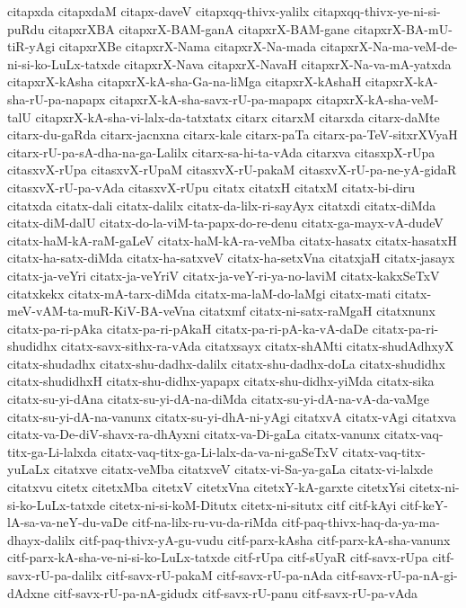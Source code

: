 {citapxda
citapxdaM
citapx-daveV
citapxqq-thivx-yalilx
citapxqq-thivx-ye-ni-si-puRdu
citapxrXBA
citapxrX-BAM-ganA
citapxrX-BAM-gane
citapxrX-BA-mU-tiR-yAgi
citapxrXBe
citapxrX-Nama
citapxrX-Na-mada
citapxrX-Na-ma-veM-de-ni-si-ko-LuLx-tatxde
citapxrX-Nava
citapxrX-NavaH
citapxrX-Na-va-mA-yatxda
citapxrX-kAsha
citapxrX-kA-sha-Ga-na-liMga
citapxrX-kAshaH
citapxrX-kA-sha-rU-pa-napapx
citapxrX-kA-sha-savx-rU-pa-mapapx
citapxrX-kA-sha-veM-talU
citapxrX-kA-sha-vi-lalx-da-tatxtatx
citarx
citarxM
citarxda
citarx-daMte
citarx-du-gaRda
citarx-jacnxna
citarx-kale
citarx-paTa
citarx-pa-TeV-sitxrXVyaH
citarx-rU-pa-sA-dha-na-ga-Lalilx
citarx-sa-hi-ta-vAda
citarxva
citasxpX-rUpa
citasxvX-rUpa
citasxvX-rUpaM
citasxvX-rU-pakaM
citasxvX-rU-pa-ne-yA-gidaR
citasxvX-rU-pa-vAda
citasxvX-rUpu
citatx
citatxH
citatxM
citatx-bi-diru
citatxda
citatx-dali
citatx-dalilx
citatx-da-lilx-ri-sayAyx
citatxdi
citatx-diMda
citatx-diM-dalU
citatx-do-la-viM-ta-papx-do-re-denu
citatx-ga-mayx-vA-dudeV
citatx-haM-kA-raM-gaLeV
citatx-haM-kA-ra-veMba
citatx-hasatx
citatx-hasatxH
citatx-ha-satx-diMda
citatx-ha-satxveV
citatx-ha-setxVna
citatxjaH
citatx-jasayx
citatx-ja-veYri
citatx-ja-veYriV
citatx-ja-veY-ri-ya-no-laviM
citatx-kakxSeTxV
citatxkekx
citatx-mA-tarx-diMda
citatx-ma-laM-do-laMgi
citatx-mati
citatx-meV-vAM-ta-muR-KiV-BA-veVna
citatxmf
citatx-ni-satx-raMgaH
citatxnunx
citatx-pa-ri-pAka
citatx-pa-ri-pAkaH
citatx-pa-ri-pA-ka-vA-daDe
citatx-pa-ri-shudidhx
citatx-savx-sithx-ra-vAda
citatxsayx
citatx-shAMti
citatx-shudAdhxyX
citatx-shudadhx
citatx-shu-dadhx-dalilx
citatx-shu-dadhx-doLa
citatx-shudidhx
citatx-shudidhxH
citatx-shu-didhx-yapapx
citatx-shu-didhx-yiMda
citatx-sika
citatx-su-yi-dAna
citatx-su-yi-dA-na-diMda
citatx-su-yi-dA-na-vA-da-vaMge
citatx-su-yi-dA-na-vanunx
citatx-su-yi-dhA-ni-yAgi
citatxvA
citatx-vAgi
citatxva
citatx-va-De-diV-shavx-ra-dhAyxni
citatx-va-Di-gaLa
citatx-vanunx
citatx-vaq-titx-ga-Li-lalxda
citatx-vaq-titx-ga-Li-lalx-da-va-ni-gaSeTxV
citatx-vaq-titx-yuLaLx
citatxve
citatx-veMba
citatxveV
citatx-vi-Sa-ya-gaLa
citatx-vi-lalxde
citatxvu
citetx
citetxMba
citetxV
citetxVna
citetxY-kA-garxte
citetxYsi
citetx-ni-si-ko-LuLx-tatxde
citetx-ni-si-koM-Ditutx
citetx-ni-situtx
citf
citf-kAyi
citf-keY-lA-sa-va-neY-du-vaDe
citf-na-lilx-ru-vu-da-riMda
citf-paq-thivx-haq-da-ya-ma-dhayx-dalilx
citf-paq-thivx-yA-gu-vudu
citf-parx-kAsha
citf-parx-kA-sha-vanunx
citf-parx-kA-sha-ve-ni-si-ko-LuLx-tatxde
citf-rUpa
citf-sUyaR
citf-savx-rUpa
citf-savx-rU-pa-dalilx
citf-savx-rU-pakaM
citf-savx-rU-pa-nAda
citf-savx-rU-pa-nA-gi-dAdxne
citf-savx-rU-pa-nA-gidudx
citf-savx-rU-panu
citf-savx-rU-pa-vAda
}
